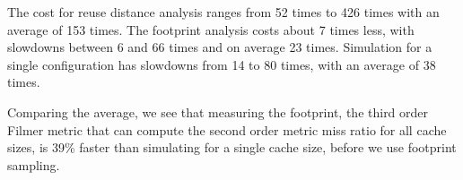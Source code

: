 The cost for reuse distance analysis ranges from 52 times to 426 times
with an average of 153 times.  The footprint analysis costs about 7
times less, with slowdowns between 6 and 66 times and on average 23
times.  Simulation for a single configuration has slowdowns from 14 to
80 times, with an average of 38 times.

Comparing the average, we see that measuring the footprint, the third
order Filmer metric that can compute the second order metric miss
ratio for all cache sizes, is 39\% faster than simulating for a single
cache size, before we use footprint sampling.

